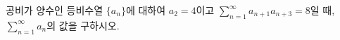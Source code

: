 공비가 양수인 등비수열 $\{a_n\}$에 대하여 $a_2=4$이고 $\displaystyle\sum_{n=1}^{\infty}a_{n+1}a_{n+3}=8$일 때, $\displaystyle\sum_{n=1}^{\infty}a_n$의 값을 구하시오.
